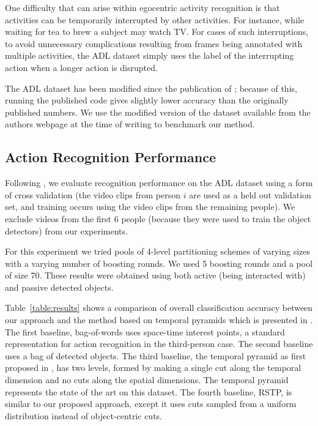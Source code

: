 \documentclass[12pt]{article} %
\begin{document}
  One difficulty that can arise within egocentric
  activity recognition is that activities can be temporarily interrupted by
  other activities. For instance, while waiting for tea to brew a subject
  may watch TV. For cases of such interruptions, to avoid unnecessary
  complications resulting from frames being annotated with multiple
  activities, the ADL dataset simply uses the label of the interrupting
  action when a longer action is disrupted.
  

	The ADL dataset has been modified since the publication of
	\cite{Ramanan12}; because of this, running the published code gives
	slightly lower accuracy than the originally published numbers. We use the
  modified version of the dataset available from the authors webpage at the time of writing to
  benchmark our method.   \subsection{Action Recognition Performance}
  Following \cite{Ramanan12}, we evaluate recognition performance on the ADL
  dataset using a form of cross
	validation (the video clips from person $i$ are used as a held out validation set, and
	training occurs using the video clips from the remaining people).
  We exclude videos from the first 6 people
  (because they were used to train the object detectors) from our
  experiments.

	For this experiment we tried pools of 4-level partitioning schemes of
  varying sizes with a varying number of boosting rounds. We used 5 boosting rounds and a pool of
  size 70.
  These results were obtained
  using both active (being interacted with) and passive detected objects.
  
  Table~\ref{table:results} shows a comparison of overall classification accuracy between our
  approach and the method based on temporal pyramids which is
  presented in \cite{Ramanan12}. The first baseline, bag-of-words uses space-time
  interest points, a standard representation for action recognition in the
  third-person case. The second baseline uses a bag of detected objects. The
  third baseline, the temporal pyramid as first proposed in \cite{Ramanan12},
  has two levels, formed by making a single cut along the temporal
  dimension and no cuts along the spatial dimensions. The temporal pyramid
  represents the state of the art on this dataset. The fourth baseline, RSTP, is
  similar to our proposed approach, except it uses cuts sampled from a uniform
  distribution instead of object-centric cuts.
  
\end{document}
